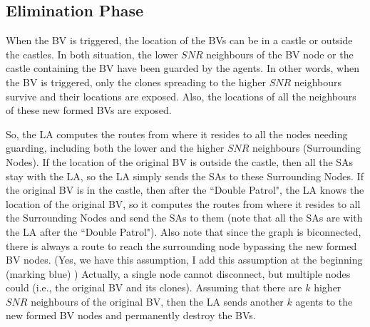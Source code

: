 \subsection{ Elimination Phase}

When the BV is triggered,   the location of the BVs can be in a castle or outside the castles. In both situation, the lower $SNR$ neighbours of the BV node or the castle containing the BV have been guarded by the agents. In other words, when the BV is triggered, only the clones spreading to the higher $SNR$ neighbours %
survive and their locations are exposed. Also, the locations of all the neighbours of these new formed BVs are exposed. 

So, the LA computes the routes from where it resides to all the nodes needing guarding, including both  the lower and the higher $SNR$ neighbours   (Surrounding Nodes). If the location of the original BV is outside the castle, then all the SAs stay  with the LA, so the LA simply sends the SAs to these Surrounding Nodes. If the original BV is in the castle, then after the  ``Double Patrol", the LA knows the location of the original BV, so it computes the routes from where it resides to all the Surrounding Nodes and send the SAs to them (note that all the SAs are with the LA after the  ``Double Patrol"). Also note that since the graph is biconnected, there is always a route to reach the surrounding node bypassing the new formed BV nodes. 
\color{blue}
(Yes, we have this assumption, I add this assumption at the beginning  (marking blue) ) 
Actually, a single node cannot disconnect, but multiple nodes could (i.e., the original BV and its clones).
\color{black}
Assuming that there are $k$ higher $SNR$ neighbours of the original BV, then   the LA sends another $k$ agents to the new formed BV nodes and permanently destroy the BVs.
   


  









































 